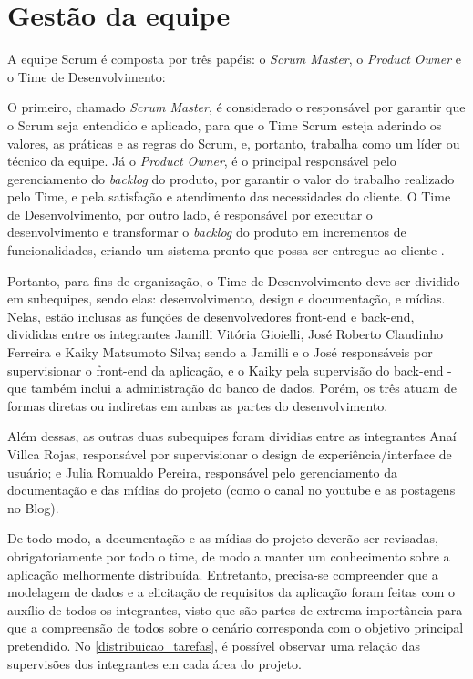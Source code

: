 \section{Gestão da equipe}
A equipe Scrum é composta por três papéis: o \textsl{Scrum Master}, o \textsl{Product Owner} e o Time de Desenvolvimento:

\begin{citacao}
O primeiro, chamado \textsl{Scrum Master}, é considerado o responsável por garantir que o Scrum seja entendido e aplicado, para que o Time Scrum esteja aderindo os valores, as práticas e as regras do Scrum, e, portanto, trabalha como um líder ou técnico da equipe. Já o \textsl{Product Owner}, é o principal responsável pelo gerenciamento do \textsl{backlog} do produto, por garantir o valor do trabalho realizado pelo Time, e pela satisfação e atendimento das necessidades do cliente. O Time de Desenvolvimento, por outro lado, é responsável por executar o desenvolvimento e transformar o \textsl{backlog} do produto em incrementos de funcionalidades, criando um sistema pronto que possa ser entregue ao cliente \cite{cruz:2018}.
\end{citacao}

Portanto, para fins de organização, o Time de Desenvolvimento deve ser dividido em subequipes, sendo elas: desenvolvimento, design e documentação, e mídias. Nelas, estão inclusas as funções de desenvolvedores \gls{front-end} e \gls{back-end}, divididas entre os integrantes Jamilli Vitória Gioielli, José Roberto Claudinho Ferreira e Kaiky Matsumoto Silva; sendo a Jamilli e o José responsáveis por supervisionar o \gls{front-end} da aplicação, e o Kaiky pela supervisão do \gls{back-end} - que também inclui a administração do banco de dados. Porém, os três atuam de formas diretas ou indiretas em ambas as partes do desenvolvimento.

Além dessas, as outras duas subequipes foram dividias entre as integrantes Anaí Villca Rojas, responsável  por supervisionar o design de experiência/interface de usuário; e Julia Romualdo Pereira, responsável pelo gerenciamento da documentação e das mídias do projeto (como o canal no \gls{youtube} e as postagens no Blog). 

De todo modo, a documentação e as mídias do projeto deverão ser revisadas, obrigatoriamente por todo o time, de modo a manter um conhecimento sobre a aplicação melhormente distribuída. Entretanto, precisa-se compreender que a modelagem de dados e a elicitação de requisitos da aplicação foram feitas com o auxílio de todos os integrantes, visto que são partes de extrema importância para que a compreensão de todos sobre o cenário corresponda com o objetivo principal pretendido. No \autoref{distribuicao_tarefas}, é possível observar uma relação das supervisões dos integrantes em cada área do projeto. 

